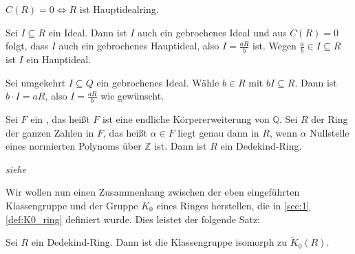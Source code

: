 \begin{lemma}[{name=[{Klassengruppe ist trivial gdw. $R$ ein Hauptidealring ist}]}]
	$C(R)=0 \iff R$ ist Hauptidealring.
\end{lemma}
\begin{beweis}
	Sei $I \subseteq R$ ein Ideal.
	Dann ist $I$ auch ein gebrochenes Ideal und aus $C(R)=0$ folgt, dass $I$ auch ein gebrochenes Hauptideal, also $I = \frac{aR}{b}$ ist.
	Wegen $\frac{a}{b} \in I \subseteq R$ ist $I$ ein Hauptideal.
	
	Sei umgekehrt $I \subseteq Q$ ein gebrochenes Ideal.
	Wähle $b \in R$ mit $b I \subseteq R$.
	Dann ist $b \cdot I=a R$, also $I= \frac{a R}{b}$ wie gewünscht. 
\end{beweis}

\begin{satz}[label=satz:2:1]
	Sei $F$ ein , das heißt $F$ ist eine endliche Körpererweiterung von $\mathbb{Q}$.
	Sei $R$ der Ring der ganzen Zahlen in $F$, das heißt $\alpha \in F$ liegt genau dann in $R$, wenn $\alpha$ Nullstelle eines normierten Polynoms über $\mathbb{Z}$ ist.
	Dann ist $R$ ein Dedekind-Ring.
\end{satz}
\begin{beweis}
	\emph{siehe }
\end{beweis}

Wir wollen nun einen Zusammenhang zwischen der eben eingeführten Klassengruppe und der Gruppe $K_0$ eines Ringes herstellen, die in \hyperref[def:K0_ring]{\cref*{sec:1} \autoref{def:K0_ring}} definiert wurde.
Dies leistet der folgende Satz:

\begin{satz}[label=satz:klassengruppe_K_0]
	Sei $R$ ein Dedekind-Ring.
	Dann ist die Klassengruppe isomorph zu $\tilde{K}_0(R)$.
\end{satz}

